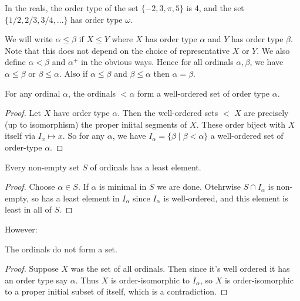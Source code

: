 \documentclass[a4paper]{scrartcl}
\begin{document}
\begin{example}
  In the reals, the order type of the set $\{-2, 3, \pi, 5\}$ is 4, and the set $\{1/2, 2/3, 3/4, \dots \}$ has order type $\omega$.
\end{example}

We will write $\alpha \leq \beta$ if $X \leq Y$ where $X$ has order type $\alpha$ and $Y$ has order type $\beta$. Note that this does not depend on the choice of representative $X$ or $Y$. We also define $\alpha < \beta$ and $\alpha^+$ in the obvious ways. Hence for all ordinals $\alpha, \beta$, we have $\alpha \leq \beta$ or $\beta \leq \alpha$. Also if $\alpha \leq \beta$ and $\beta \leq \alpha$ then $\alpha = \beta$.

\begin{proposition}
  For any ordinal $\alpha$, the ordinals $<\alpha$ form a well-ordered set of order type $\alpha$. 
\end{proposition}
\begin{proof}
  Let $X$ have order type $\alpha$. Then the well-ordered sets $<$ $X$ are precisely (up to isomorphism) the proper iniital segments of $X$. These order biject with $X$ itself via $I_x \mapsto x$. So for any $\alpha$, we have $I_\alpha = \{\beta \mid \beta < \alpha\}$ a well-ordered set of order-type $\alpha$.
\end{proof}

\begin{proposition}
  Every non-empty set $S$ of ordinals has a least element.
\end{proposition}
\begin{proof}
  Choose $\alpha \in S$. If $\alpha$ is minimal in $S$ we are done. Otehrwise $S \cap I_\alpha$ is non-empty, so has a least element in $I_\alpha$ since $I_\alpha$ is well-ordered, and this element is least in all of $S$.
\end{proof}

However:

\begin{theorem}
  The ordinals do not form a set.
\end{theorem}
\begin{proof}
  Suppose $X$ was the set of all ordinals. Then since it's well ordered it has an order type say $\alpha$. Thus $X$ is order-isomorphic to $I_\alpha$, so $X$ is order-isomorphic to a proper initial subset of itself, which is a contradiction.
\end{proof}
\end{document}

